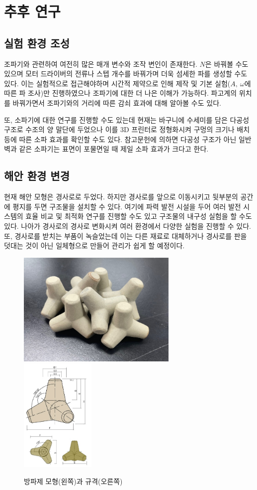 \section{추후 연구}

\subsection{실험 환경 조성}
조파기와 관련하여 여전히 많은 매개 변수와 조작 변인이 존재한다. $N$은 바꿔볼 수도 있으며 모터 드라이버의 전류나 스텝 개수를 바꿔가며 더욱 섬세한 파를 생성할 수도 있다. 이는 실험적으로 접근해야하며 시간적 제약으로 인해 제작 및 기본 실험($A,~\omega$에 따른 파 조사)만 진행하였으나 조파기에 대한 더 나은 이해가 가능하다. 파고계의 위치를 바꿔가면서 조파기와의 거리에 따른 감쇠 효과에 대해 알아볼 수도 있다.

또, 소파기에 대한 연구를 진행할 수도 있는데 현재는 바구니에 수세미를 담은 다공성 구조로 수조의 양 말단에 두었으나 이를 3D 프린터로 정형화시켜 구멍의 크기나 배치 등에 따른 소파 효과를 확인할 수도 있다. 참고문헌에 의하면 다공성 구조가 아닌 일반 벽과 같은 소파기는 표면이 포물면일 때 제일 소파 효과가 크다고 한다.

\subsection{해안 환경 변경}
현재 해안 모형은 경사로로 두었다. 하지만 경사로를 앞으로 이동시키고 뒷부분의 공간에 평지를 두면 구조물을 설치할 수 있다. 여기에 파력 발전 시설을 두어 여러 발전 시스템의 효율 비교 및 최적화 연구를 진행할 수도 있고 구조물의 내구성 실험을 할 수도 있다. 나아가 경사로의 경사로 변화시켜 여러 환경에서 다양한 실험을 진행할 수 있다. 또, 경사로를 받치는 부품이 녹슬었는데 이는 다른 재료로 대체하거나 경사로를 판을 덧대는 것이 아닌 일체형으로 만들어 관리가 쉽게 할 예정이다.

\begin{figure}[htbp]
    \centering
    \includegraphics[height=5.5cm]{images/Breakwater.jpg}
    \includegraphics[height=5.5cm]{images/Breakwater(Illustrated).jpg}
    \caption{방파제 모형(왼쪽)과 규격(오른쪽)}
    \label{Braekwater}
\end{figure}

